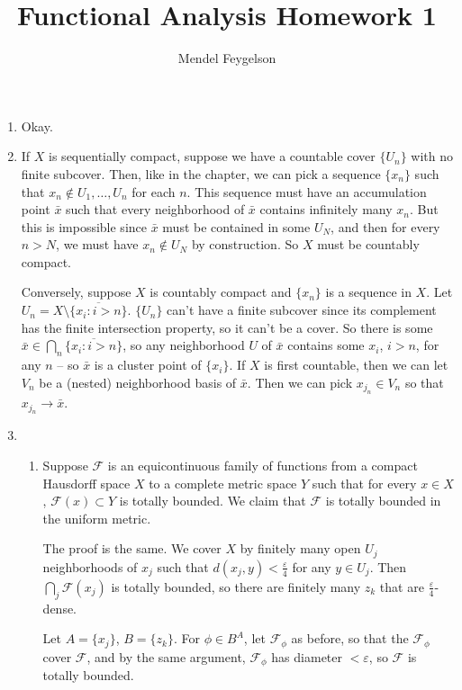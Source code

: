 \documentclass{article}
\title{Functional Analysis Homework 1}
\author{Mendel Feygelson}
\newcommand\F{\mathscr F}
\begin{document}
\maketitle
\begin{enumerate}

  \item Okay.

  \item If $X$ is sequentially compact, suppose we have a countable cover
     $\{U_n\}$ with no finite subcover. Then, like in the chapter, we can pick a
     sequence $\{x_n\}$ such that $x_n \not\in U_1,\dotsc,U_n$ for each $n$.
     This sequence must have an accumulation point $\bar x$ such that every
     neighborhood of $\bar x$ contains infinitely many $x_n$. But this is
     impossible since $\bar x$ must be contained in some $U_N$, and then for
     every $n > N$, we must have $x_n \not\in U_N$ by construction. So $X$ must
     be countably compact.

     Conversely, suppose $X$ is countably compact and $\{x_n\}$ is a sequence in
     $X$. Let $U_n = X \setminus \overline{\{x_i : i > n \}}$. $\{U_n\}$ can't
     have a finite subcover since its complement has the finite intersection
     property, so it can't be a cover. So there is some $\bar x \in \bigcap_n
     \overline{\{x_i : i > n\}}$, so any neighborhood $U$ of $\bar x$ contains
     some $x_i$, $i > n$, for any $n$ -- so $\bar x$ is a cluster point of
     $\{x_i\}$. If $X$ is first countable, then we can let $V_n$ be a (nested)
     neighborhood basis of $\bar x$. Then we can pick $x_{j_n} \in V_n$ so that
     $x_{j_n} \to \bar x$.

  \item \begin{enumerate}
        \item Suppose $\F$ is an equicontinuous family of functions from a
           compact Hausdorff space $X$ to a complete metric space $Y$ such that
           for every $x \in X$, $\F(x) \subset Y$ is totally bounded. We claim
           that $\F$ is totally bounded in the uniform metric.

           The proof is the same. We cover $X$ by finitely many open $U_j$
           neighborhoods of $x_j$ such that $d(x_j,y) < \frac{\varepsilon}{4}$
           for any $y \in U_j$. Then $\bigcap_j \F(x_j)$ is totally bounded, so
           there are finitely many $z_k$ that are $\frac{\varepsilon}{4}$-dense.

           Let $A = \{x_j\}$, $B = \{z_k\}$. For $\phi \in B^A$, let $\F_\phi$
           as before, so that the $\F_\phi$ cover $\F$, and by the same
           argument, $\F_\phi$ has diameter $<\varepsilon$, so $\F$ is totally
           bounded.


\end{enumerate}
\end{enumerate}
\end{document}
